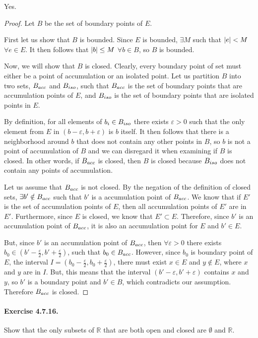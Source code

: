 \documentclass[11pt]{article}
\DeclarePairedDelimiter{\abs}{\lvert}{\rvert}
\def \R {\mathbb{R}}
\def \epsilon {\varepsilon}
\def \halfepsilon{\frac{\epsilon}{2}}
\begin{document}
Yes. 
\begin{proof}
	Let $B$ be the set of boundary points of $E$. 
	
	First let us show that $B$ is bounded. Since $E$ is bounded, $\exists M$ such that $\abs{e} < M$ $\forall e \in E$. It then follows that $\abs{b} \leq M$ $\forall b \in B$, so $B$ is bounded. 
			
	Now, we will show that $B$ is closed. Clearly, every boundary point of set must either be a point of accumulation or an isolated point. Let us partition $B$ into two sets, $B_{acc}$ and $B_{iso}$, such that $B_{acc}$ is the set of boundary points that are accumulation points of $E$, and $B_{iso}$ is the set of boundary points that are isolated points in $E$. 
	
	By definition, for all elements of $b_i \in B_{iso}$ there exists $\epsilon > 0$ such that the only element from $E$ in $(b - \epsilon, b + \epsilon)$ is $b$ itself. It then follows that there is a neighborhood around $b$ that does not contain any other points in $B$, so $b$ is not a point of accumulation of $B$ and we can disregard it when examining if $B$ is closed. In other words, if $B_{acc}$ is closed, then $B$ is closed because $B_{iso}$ does not contain any points of accumulation.

	Let us assume that $B_{acc}$ is not closed. By the negation of the definition of closed sets, $\exists b' \notin B_{acc}$ such that $b'$ is a accumulation point of $B_{acc}$. 
	We know that if $E'$ is the set of accumulation points of $E$, then all accumulation points of $E'$ are in $E'$. Furthermore, since $E$ is closed, we know that $E' \subset E$. Therefore, since $b'$ is an accumulation point of $B_{acc}$, it is also an accumulation point for $E$ and $b' \in E$. 
	
	But, since $b'$ is an accumulation point of $B_{acc}$, then $\forall \epsilon > 0$ there exists $b_0 \in (b' - \halfepsilon, b' + \halfepsilon)$, such that $b_0 \in B_{acc}$.	However, since $b_0$ is boundary point of $E$, the interval $I = (b_0 - \halfepsilon, b_0 + \halfepsilon)$, there must exist $x \in E$ and $y \notin E$, where $x$ and $y$ are in $I$. But, this means that the interval $(b' - \epsilon, b' + \epsilon)$ contains $x$ and $y$, so $b'$ is a boundary point and $b' \in B$, which contradicts our assumption. Therefore $B_{acc}$ is closed.
	
\end{proof}

\paragraph{Exercise 4.7.16.} Show that the only subsets of $\R$ that are both open and closed are $\emptyset$ and $\R$.
\end{document}
